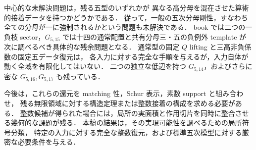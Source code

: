 中心的な未解決問題は，残る五型のいずれかが
異なる高分母を混在させた算術的接着データを持つかどうかである．
従って，一般の五次分母剛性，すなわち全ての分母が一に強制されるかという問題も未解決である．
book では二つの一負枝 sector，$G_{5,15}$ では十四の通常配置と共有分母三・五の負例外 template が
次に調べるべき具体的な残余問題となる．
通常型の固定 $Q$ lifting と三高非負係数の固定五データ復元は，
各入力に対する完全な手順を与えるが，入力自体が動く全域を有限化してはいない．
二つの独立な低辺を持つ $G_{5,14}$，およびさらに密な $G_{5,16},G_{5,17}$ も残っている．

今後は，これらの還元を matching 性，Schur 表示，素数 support と組み合わせ，
残る無限領域に対する構造定理または整数接着の構成を求める必要がある．
整数候補が得られた場合には，局所の実面積と作用切片を同時に整合させる幾何的な課題が残る．
本稿の結果は，その実現可能性を調べるための局所符号分類，
特定の入力に対する完全な整数復元，および標準五次模型に対する厳密な必要条件を与える．
